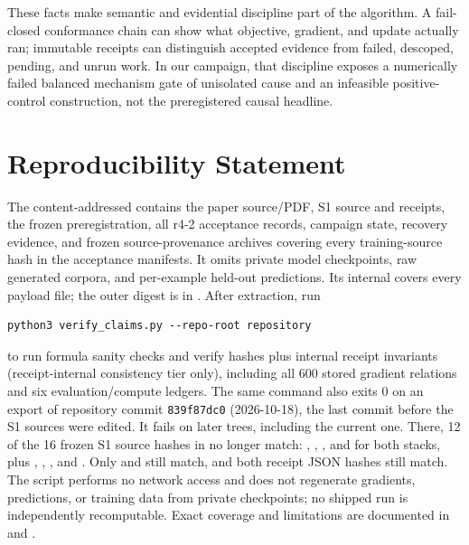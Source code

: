 \documentclass{article}
\begin{document}
These facts make semantic and evidential discipline part of the algorithm.  A
fail-closed conformance chain can show what objective, gradient, and update
actually ran; immutable receipts can distinguish accepted evidence from failed,
descoped, pending, and unrun work.  In our campaign, that discipline exposes a
numerically failed balanced mechanism gate of unisolated cause and an
infeasible positive-control construction, not the preregistered causal
headline.

\section*{Reproducibility Statement}

The content-addressed  contains the paper source/PDF,
S1 source and receipts, the frozen preregistration, all r4-2 acceptance records,
campaign state, recovery evidence, and frozen source-provenance archives
covering every training-source hash in the acceptance manifests.  It omits
private model checkpoints, raw generated corpora, and per-example held-out
predictions.  Its
internal  covers every payload file; the outer digest is
in .  After extraction, run
\begin{verbatim}
python3 verify_claims.py --repo-root repository
\end{verbatim}
to run formula sanity checks and verify hashes plus internal receipt invariants
(receipt-internal consistency tier only), including all 600 stored gradient
relations and six evaluation/compute ledgers.  The same command also exits 0
on an export of repository commit \texttt{839f87dc0} (2026-10-18), the last
commit before the S1 sources were edited.  It fails on later trees, including
the current one.  There, 12 of the 16 frozen S1 source hashes in
 no longer match: ,
, , and  for
both stacks, plus , ,
, and .  Only
 and  still match, and both receipt
JSON hashes still match.  The script performs
no network access and does not regenerate gradients, predictions, or
training data from private checkpoints; no shipped run is independently
recomputable.  Exact coverage and
limitations are documented in  and
.
\end{document}
